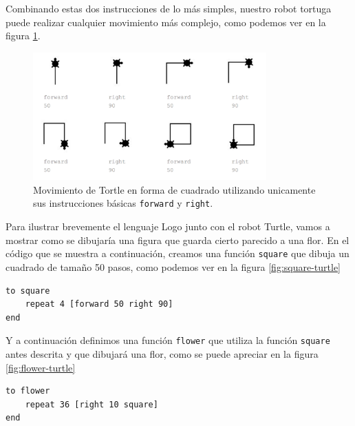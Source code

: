 Combinando estas dos instrucciones de lo más simples, nuestro robot tortuga puede realizar cualquier movimiento más complejo, como podemos ver en la figura \ref{fig:mov-tortle}.

\begin{figure}[!ht]
	\begin{centering}
		\includegraphics[width=0.8\textwidth]{images/mov-tortle.png}
			\caption{Movimiento de Tortle en forma de cuadrado utilizando unicamente sus instrucciones básicas \texttt{forward} y \texttt{right}.}
				\label{fig:mov-tortle}
	\end{centering}
\end{figure}

Para ilustrar brevemente el lenguaje Logo junto con el robot Turtle, vamos a mostrar como se dibujaría una figura que guarda cierto parecido a una flor.
En el código que se muestra a continuación, creamos una función \texttt{square} que dibuja un cuadrado de tamaño 50 pasos, como podemos ver en la figura \ref{fig:square-turtle}

\begin{lstlisting}
to square
	repeat 4 [forward 50 right 90]
end
\end{lstlisting}

Y a continuación definimos una función \texttt{flower} que utiliza la función \texttt{square} antes descrita y que dibujará una flor, como se puede apreciar en la figura \ref{fig:flower-turtle}

\begin{lstlisting}
to flower
	repeat 36 [right 10 square]
end
\end{lstlisting}

